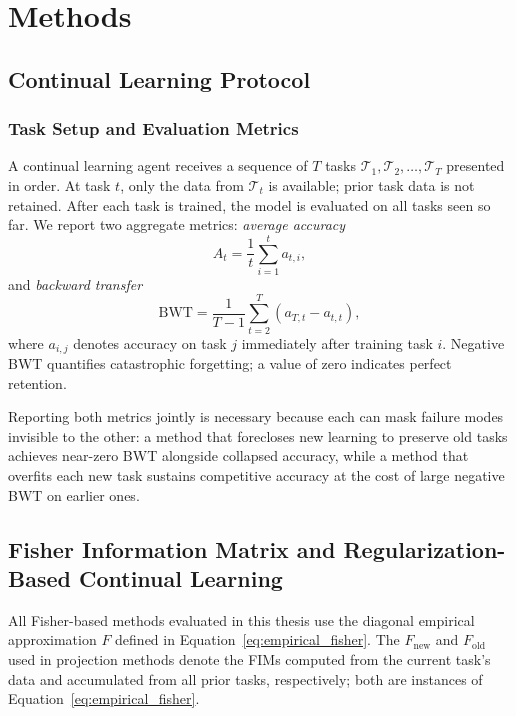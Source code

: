 \section{Methods}
\label{sec:methods}
\subsection{Continual Learning Protocol}
\label{sec:cl_protocol}

\subsubsection{Task Setup and Evaluation Metrics}
A continual learning agent receives a sequence of $T$ tasks
$\mathcal{T}_1, \mathcal{T}_2, \ldots, \mathcal{T}_T$ presented in order.
At task $t$, only the data from $\mathcal{T}_t$ is available; prior task
data is not retained.
After each task is trained, the model is evaluated on all tasks seen so far.
We report two aggregate metrics: \emph{average accuracy}
\begin{equation}
    A_t = \frac{1}{t}\sum_{i=1}^{t} a_{t,i},
\end{equation}
and \emph{backward transfer}
\begin{equation}
    \mathrm{BWT} = \frac{1}{T-1}\sum_{t=2}^{T}(a_{T,t}-a_{t,t}),
\end{equation}
where $a_{i,j}$ denotes accuracy on task $j$ immediately after training
task $i$.
Negative BWT quantifies catastrophic forgetting; a value of zero indicates
perfect retention.

Reporting both metrics jointly is necessary because each can mask
failure modes invisible to the other: a method that forecloses new
learning to preserve old tasks achieves near-zero BWT alongside collapsed
accuracy, while a method that overfits each new task sustains competitive
accuracy at the cost of large negative BWT on earlier ones.

\subsection{Fisher Information Matrix and Regularization-Based Continual Learning}
\label{sec:fisher_ewc}

All Fisher-based methods evaluated in this thesis use the diagonal empirical
approximation $F$ defined in Equation~\eqref{eq:empirical_fisher}.
The $F_{\mathrm{new}}$ and $F_{\mathrm{old}}$ used in
projection methods denote the FIMs computed from the current task's data and
accumulated from all prior tasks, respectively; both are instances of Equation~\eqref{eq:empirical_fisher}.


